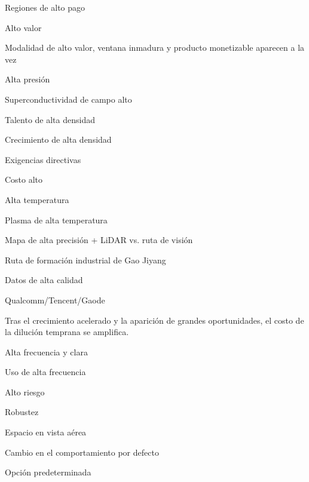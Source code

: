 \documentclass{article}
\begin{document}
Regiones de alto pago

Alto valor

Modalidad de alto valor, ventana inmadura y producto monetizable aparecen a la vez

Alta presión

Superconductividad de campo alto

Talento de alta densidad

Crecimiento de alta densidad

Exigencias directivas

Costo alto

Alta temperatura

Plasma de alta temperatura

Mapa de alta precisión + LiDAR vs. ruta de visión

Ruta de formación industrial de Gao Jiyang

Datos de alta calidad

Qualcomm/Tencent/Gaode

Tras el crecimiento acelerado y la aparición de grandes oportunidades, el costo de la dilución temprana se amplifica.

Alta frecuencia y clara

Uso de alta frecuencia

Alto riesgo

Robustez

Espacio en vista aérea

Cambio en el comportamiento por defecto

Opción predeterminada
\end{document}
